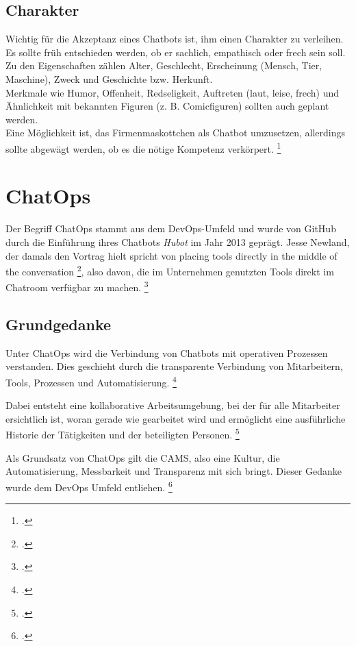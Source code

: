 \subsection{Charakter}
Wichtig für die Akzeptanz eines Chatbots ist, ihm einen Charakter zu verleihen. Es sollte früh entschieden werden, ob er sachlich, empathisch oder frech sein soll.\\
Zu den Eigenschaften zählen Alter, Geschlecht, Erscheinung (Mensch, Tier, Maschine), Zweck und Geschichte bzw. Herkunft.\\
Merkmale wie Humor, Offenheit, Redseligkeit, Auftreten (laut, leise, frech) und Ähnlichkeit mit bekannten Figuren (z. B. Comicfiguren) sollten auch geplant werden.\\
Eine Möglichkeit ist, das Firmenmaskottchen als Chatbot umzusetzen, allerdings sollte abgewägt werden, ob es die nötige Kompetenz verkörpert.
\footcite[Vgl.][68\psq]{Puscher_2018_Gut_zugehoert}




\section{ChatOps}
Der Begriff ChatOps stammt aus dem DevOps-Umfeld und wurde von GitHub durch die Einführung ihres Chatbots \textit{Hubot} im Jahr 2013 geprägt. Jesse Newland, der damals den Vortrag hielt spricht von \glqq{}placing tools
directly in the middle of the conversation\grqq
\footcite[Vgl.][62]{GitHub_2013_Chatops},
also davon, die im Unternehmen genutzten Tools direkt im Chatroom verfügbar zu machen.
\footcite[Vgl.][o. \pno]{Sigler_2014_Chatops}

\subsection{Grundgedanke}
Unter ChatOps wird die Verbindung von Chatbots mit operativen Prozessen verstanden. Dies geschieht durch die transparente Verbindung von Mitarbeitern, Tools, Prozessen und Automatisierung.
\footcite[Vgl.][o. \pno]{Zyane_2017_ChatOps}

Dabei entsteht eine kollaborative Arbeitsumgebung, bei der für alle Mitarbeiter ersichtlich ist, woran gerade wie gearbeitet wird und ermöglicht eine ausführliche Historie der Tätigkeiten und der beteiligten Personen.
\footcite[Vgl.][190]{Betz_2016_Digital}

Als Grundsatz von ChatOps gilt die \acf{CAMS}, also eine Kultur, die Automatisierung, Messbarkeit und Transparenz mit sich bringt. Dieser Gedanke wurde dem DevOps Umfeld entliehen.
\footcite[Vgl.][o. \pno]{Zyane_2017_ChatOps}

